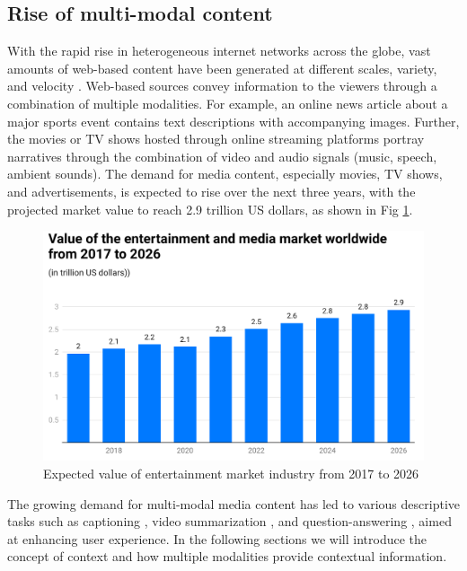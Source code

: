     
\subsection{Rise of multi-modal content}

With the rapid rise in heterogeneous internet networks across the globe, vast amounts of web-based content have been generated at different scales, variety, and velocity \cite{Gao2020ASO}. Web-based sources convey information to the viewers through a combination of multiple modalities. For example, an online news article about a major sports event contains text descriptions with accompanying images. Further, the movies or TV shows hosted through online streaming platforms portray narratives through the combination of video and audio signals (music, speech, ambient sounds). 
The demand for media content, especially movies, TV shows, and advertisements, is expected to rise over the next three years, with the projected market value to reach 2.9 trillion US dollars, as shown in Fig \ref{media industry demand}.
\begin{figure}[h!]
    \centering 
     \includegraphics[width=0.6\linewidth]{figures/media_industry_demand.png}
     \caption[Media value]{Expected value of entertainment market industry from 2017 to 2026 \footnotemark} 
     \label{media industry demand}
\end{figure}
The growing demand for multi-modal media content has led to various descriptive tasks such as captioning \cite{Abdar2023ARO}, video summarization \cite{Apostolidis2021VideoSU}, and question-answering \cite{defaria2023visual}, aimed at enhancing user experience. In the following sections we will introduce the concept of context and how multiple modalities provide contextual information.


